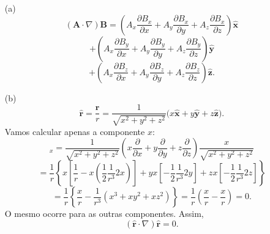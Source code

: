 \documentclass[a4paper,12pt]{article}
\begin{document}
\begin{enumerate}
    \item[(a)] 
    \begin{equation}
    (\mathbf{A} \cdot \nabla) \mathbf{B} = \left( A_x \frac{\partial B_x}{\partial x} + A_y \frac{\partial B_x}{\partial y} + A_z \frac{\partial B_x}{\partial z} \right) \hat{\mathbf{x}} 
    \end{equation}
    \begin{equation}
    + \left( A_x \frac{\partial B_y}{\partial x} + A_y \frac{\partial B_y}{\partial y} + A_z \frac{\partial B_y}{\partial z} \right) \hat{\mathbf{y}}
    \end{equation}
    \begin{equation}
    + \left( A_x \frac{\partial B_z}{\partial x} + A_y \frac{\partial B_z}{\partial y} + A_z \frac{\partial B_z}{\partial z} \right) \hat{\mathbf{z}}.
    \end{equation}

    \item[(b)]
    \begin{equation}
    \hat{\mathbf{r}} = \frac{\mathbf{r}}{r} = \frac{1}{\sqrt{x^2 + y^2 + z^2}}\Big(x \hat{\mathbf{x}} + y \hat{\mathbf{y}} + z \hat{\mathbf{z}}\Big).
    \end{equation}
    Vamos calcular apenas a componente \( x \):
    \begin{equation}
    [(\hat{\mathbf{r}} \cdot \nabla) \hat{\mathbf{r}}]_x = \frac{1}{\sqrt{x^2 + y^2 + z^2}} \left( x \frac{\partial}{\partial x} + y \frac{\partial}{\partial y} + z \frac{\partial}{\partial z} \right) \frac{x}{\sqrt{x^2 + y^2 + z^2}}
    \end{equation}
    \begin{equation}
    = \frac{1}{r} \left\{ x \left[ \frac{1}{r} - x \left( \frac{1}{2} \frac{1}{r^3} 2x \right) \right] 
    + y x \left[ -\frac{1}{2} \frac{1}{r^3} 2y \right] 
    + z x \left[ -\frac{1}{2} \frac{1}{r^3} 2z \right] \right\}
    \end{equation}
    \begin{equation}
    = \frac{1}{r} \left\{ \frac{x}{r} - \frac{1}{r^3} (x^3 + xy^2 + xz^2) \right\} 
    = \frac{1}{r} \left( \frac{x}{r} - \frac{x}{r} \right) = 0.
    \end{equation}
    O mesmo ocorre para as outras componentes. Assim, 
    \begin{equation}
    \boxed{(\hat{\mathbf{r}} \cdot \nabla) \hat{\mathbf{r}} = 0}.
    \end{equation}


\end{enumerate}
\end{document}
